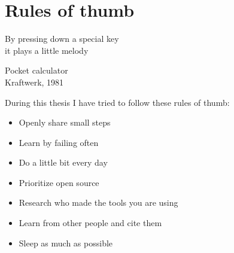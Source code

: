 \chapter{Rules of thumb}

\epigraph{By pressing down a special key \\ it plays a little melody}{Pocket calculator \\ Kraftwerk, 1981}

During this thesis I have tried to follow these rules of thumb:

\begin{itemize}
  \item Openly share small steps
  \item Learn by failing often
  \item Do a little bit every day
  \item Prioritize open source
  \item Research who made the tools you are using
  \item Learn from other people and cite them
  \item Sleep as much as possible
\end{itemize}

